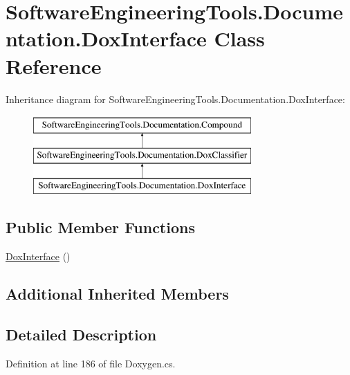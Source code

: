 \hypertarget{class_software_engineering_tools_1_1_documentation_1_1_dox_interface}{\section{Software\+Engineering\+Tools.\+Documentation.\+Dox\+Interface Class Reference}
\label{class_software_engineering_tools_1_1_documentation_1_1_dox_interface}
}
Inheritance diagram for Software\+Engineering\+Tools.\+Documentation.\+Dox\+Interface\+:\begin{figure}[H]
\begin{center}
\leavevmode
\includegraphics[height=3.000000cm]{class_software_engineering_tools_1_1_documentation_1_1_dox_interface}
\end{center}
\end{figure}
\subsection*{Public Member Functions}
\begin{DoxyCompactItemize}
\item 
\hyperlink{class_software_engineering_tools_1_1_documentation_1_1_dox_interface_a6160aea4a2ce4faabd6ce710c5dfb331}{Dox\+Interface} ()
\end{DoxyCompactItemize}
\subsection*{Additional Inherited Members}


\subsection{Detailed Description}


Definition at line 186 of file Doxygen.\+cs.



